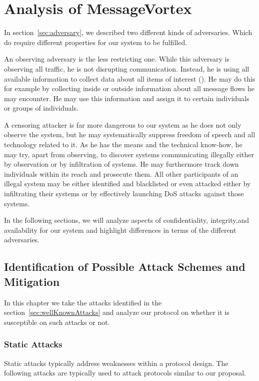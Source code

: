 \part{Analysis of MessageVortex\label{sec:analysis}}
In section~\ref{sec:adversary}, we described two different kinds of adversaries. Which do require different properties for our system to be fulfilled.

An observing adversary is the less restricting one. While this adversary is observing all traffic, he is not disrupting communication. Instead, he is using all available information to collect data about all items of interest (). He may do this for example by collecting inside or outside information about all message flows he may encounter. He may use this information and assign it to certain individuals or groups of individuals.

A censoring attacker is far more dangerous to our system as he does not only observe the system, but he may systematically suppress freedom of speech and all technology related to it. As he has the means and the technical know-how, he may try, apart from observing, to discover systems communicating illegally either by observation or by infiltration of systems. He may furthermore track down individuals within its reach and prosecute them. All other participants of an illegal system may be either identified and blacklisted or even attacked either by infiltrating their systems or by effectively launching DoS attacks against those systems.

In the following sections, we will analyze aspects of confidentiality, integrity,and availability for our system and highlight differences in terms of the different adversaries.

\chapter{Identification of Possible Attack Schemes and Mitigation\label{sec:attacks}}
In this chapter we take the attacks identified in the section~\ref{sec:wellKnownAttacks} and analyze our protocol on whether it is susceptible on such attacks or not.

\section{Static Attacks}
Static attacks typically address weaknesses within a protocol design. The following attacks are typically used to attack protocols similar to our proposal.

